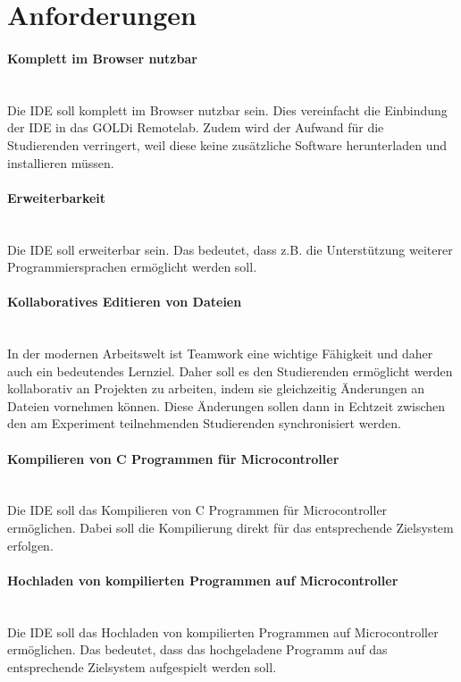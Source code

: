 \section{Anforderungen} \label{anforderungen}

\paragraph{Komplett im Browser nutzbar} \mbox{} \\
Die IDE soll komplett im Browser nutzbar sein. Dies vereinfacht die Einbindung der IDE in das GOLDi Remotelab. Zudem wird der Aufwand für die Studierenden verringert, weil diese keine zusätzliche Software herunterladen und installieren müssen.

\paragraph{Erweiterbarkeit} \mbox{} \\
Die IDE soll erweiterbar sein. Das bedeutet, dass z.B. die Unterstützung weiterer Programmiersprachen ermöglicht werden soll.

\paragraph{Kollaboratives Editieren von Dateien} \mbox{} \\
In der modernen Arbeitswelt ist Teamwork eine wichtige Fähigkeit und daher auch ein bedeutendes Lernziel. Daher soll es den Studierenden ermöglicht werden kollaborativ an Projekten zu arbeiten, indem sie gleichzeitig Änderungen an Dateien vornehmen können. Diese Änderungen sollen dann in Echtzeit zwischen den am Experiment teilnehmenden Studierenden synchronisiert werden.

\paragraph{Kompilieren von C Programmen für Microcontroller} \mbox{} \\
Die IDE soll das Kompilieren von C Programmen für Microcontroller ermöglichen. Dabei soll die Kompilierung direkt für das entsprechende Zielsystem erfolgen.

\paragraph{Hochladen von kompilierten Programmen auf Microcontroller} \mbox{} \\
Die IDE soll das Hochladen von kompilierten Programmen auf Microcontroller ermöglichen. Das bedeutet, dass das hochgeladene Programm auf das entsprechende Zielsystem aufgespielt werden soll.

